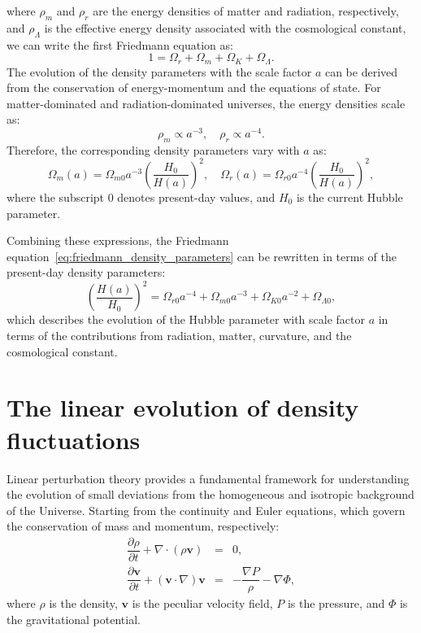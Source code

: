 where \( \rho_m \) and \( \rho_r \) are the energy densities of matter and radiation, respectively, and \( \rho_\Lambda \) is the effective energy density associated with the cosmological constant, we can write the first Friedmann equation as:
\begin{equation}
    1 = \Omega_r + \Omega_m + \Omega_K + \Omega_\Lambda.
    \label{eq:friedmann_density_parameters}
\end{equation}
The evolution of the density parameters with the scale factor \( a \) can be derived from the conservation of energy-momentum and the equations of state. For matter-dominated and radiation-dominated universes, the energy densities scale as:
\begin{equation}
    \rho_m \propto a^{-3}, \quad \rho_r \propto a^{-4}.
    \label{eq:energy_density_scaling}
\end{equation}
Therefore, the corresponding density parameters vary with \( a \) as:
\begin{equation}
    \Omega_m(a) = \Omega_{m0} a^{-3} \left( \frac{H_0}{H(a)} \right)^2, \quad \Omega_r(a) = \Omega_{r0} a^{-4} \left( \frac{H_0}{H(a)} \right)^2,
    \label{eq:density_parameters_evolution}
\end{equation}
where the subscript \( 0 \) denotes present-day values, and \( H_0 \) is the current Hubble parameter.

Combining these expressions, the Friedmann equation~\eqref{eq:friedmann_density_parameters} can be rewritten in terms of the present-day density parameters:
\begin{equation}
    \left( \frac{H(a)}{H_0} \right)^2 = \Omega_{r0} a^{-4} + \Omega_{m0} a^{-3} + \Omega_{K0} a^{-2} + \Omega_{\Lambda0},
    \label{eq:friedmann_rewritten}
\end{equation}
which describes the evolution of the Hubble parameter with scale factor \( a \) in terms of the contributions from radiation, matter, curvature, and the cosmological constant.

\section{The linear evolution of density fluctuations}
Linear perturbation theory provides a fundamental framework for understanding the evolution of small deviations from the homogeneous and isotropic background of the Universe. Starting from the continuity and Euler equations, which govern the conservation of mass and momentum, respectively:
\begin{eqnarray}
    \label{eq:continuity_equation}
    \dfrac{\partial \rho}{\partial t} + \nabla \cdot (\rho \boldsymbol{v}) &=& 0, \\[2ex]
    \label{eq:euler_equation}
    \dfrac{\partial \boldsymbol{v}}{\partial t} + (\boldsymbol{v} \cdot \nabla) \boldsymbol{v} &=& -\dfrac{\nabla P}{\rho} - \nabla \Phi,
\end{eqnarray}
where \( \rho \) is the density, \( \boldsymbol{v} \) is the peculiar velocity field, \( P \) is the pressure, and \( \Phi \) is the gravitational potential.


